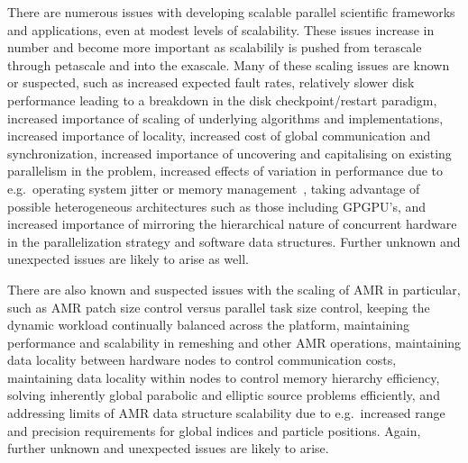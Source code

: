 \documentclass[10pt,twocolumn]{article}
\begin{document}
There are numerous issues with developing scalable parallel scientific
frameworks and applications, even at modest levels of scalability.
These issues increase in number and become more important as
scalabilily is pushed from terascale through petascale and into the
exascale.  Many of these scaling issues are known or suspected, such
as increased expected fault rates, relatively slower disk performance
leading to a breakdown in the disk checkpoint/restart paradigm,
increased importance of scaling of underlying algorithms and
implementations, increased importance of locality, increased cost of
global communication and synchronization, increased importance of
uncovering and capitalising on existing parallelism in the problem,
increased effects of variation in performance due to e.g.~operating
system jitter or memory management~\cite{StSh09}, taking advantage of
possible heterogeneous architectures such as those including GPGPU's,
and increased importance of mirroring the hierarchical nature of
concurrent hardware in the parallelization strategy and software data
structures.  Further unknown and unexpected issues are likely to arise
as well.

There are also known and suspected issues with the scaling of AMR in
particular, such as AMR patch size control versus parallel task size
control, keeping the dynamic workload continually balanced across the
platform, maintaining performance and scalability in remeshing and
other AMR operations, maintaining data locality between hardware nodes
to control communication costs, maintaining data locality within nodes
to control memory hierarchy efficiency, solving inherently global
parabolic and elliptic source problems efficiently, and addressing
limits of AMR data structure scalability due to e.g.~increased range
and precision requirements for global indices and particle positions.
Again, further unknown and unexpected issues are likely to arise.
\end{document}
